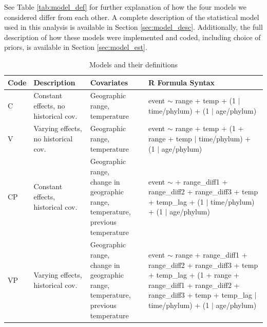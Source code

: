 \documentclass[12pt,letterpaper]{article}
\begin{document}
\begin{refsection}
See Table \ref{tab:model_def} for further explanation of how the four models we considered differ from each other. A complete description of the statistical model used in this analysis is available in Section \ref{sec:model_desc}. Additionally, the full description of how these models were implemented and coded, including choice of priors, is available in Section \ref{sec:model_est}.


\begin{table}[ht]
 \caption{Models and their definitions}
 \begin{threeparttable}
  {
   \def\arraystretch{1.5}
   \begin{tabular}{ l p{3cm} l l }
    Code & Description & Covariates & R Formula Syntax\tnote{a}\phantom{\textsuperscript{a}} \\
    \hline
    C & Constant effects, no historical cov. & \parbox[t]{0.25\textwidth}{Geographic range,\\temperature} & \parbox[t]{0.33\textwidth}{event $\sim$ range + temp +\\(1 $|$ time/phylum) +\\(1 $|$ age/phylum)} \\
    V & Varying effects, no historical cov. & \parbox[t]{0.25\textwidth}{Geographic range,\\temperature} & \parbox[t]{0.33\textwidth}{event $\sim$ range + temp +\\(1 + range + temp $|$ time/phylum) + (1 $|$ age/phylum)} \\ 
    CP & Constant effects, historical cov. & \parbox[t]{0.25\textwidth}{Geographic range,\\change in geographic range, temperature,\\previous temperature} & \parbox[t]{0.33\textwidth}{event $\sim$ + range\_diff1 + range\_diff2 + range\_diff3 + \\temp + temp\_lag +\\(1 $|$ time/phylum) +\\(1 $|$ age/phylum)} \\
    VP & Varying effects, historical cov. & \parbox[t]{0.25\textwidth}{Geographic range,\\change in geographic range, temperature,\\previous temperature} & \parbox[t]{0.33\textwidth}{event $\sim$ range + range\_diff1 + range\_diff2 + range\_diff3 + \\temp + temp\_lag +\\(1 + range + range\_diff1 + range\_diff2 + range\_diff3 +\\temp + temp\_lag $|$ time/phylum) +\\(1 $|$ age/phylum)} \\

\end{tabular}}
\end{threeparttable}
\end{table}
\end{refsection}
\end{document}
